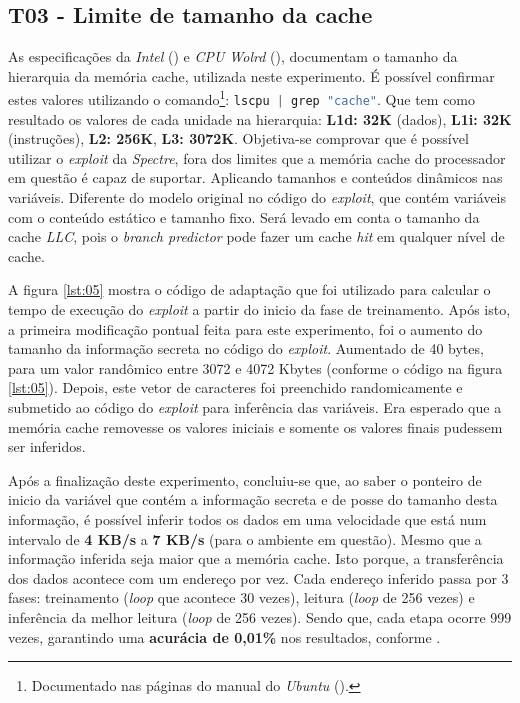 \documentclass[conference]{IEEEtran}
\begin{document}
\subsection{T03 - Limite de tamanho da cache}
As especificações da \emph{Intel} (\citeyear{Intel2019Corei3}) e \emph{CPU Wolrd} (\citeyear{CPU2016Corei3}), documentam o tamanho da hierarquia da memória cache, utilizada neste experimento. É possível confirmar estes valores utilizando o comando\footnote{Documentado nas páginas do manual do \emph{Ubuntu} (\citeyear{Ubuntu2019Lscpu}).}: \lstinline[language=C, style=c]{lscpu | grep "cache"}. Que tem como resultado os valores de cada unidade na hierarquia: \textbf{L1d: 32K} (dados), \textbf{L1i: 32K} (instruções), \textbf{L2: 256K}, \textbf{L3: 3072K}. Objetiva-se comprovar que é possível utilizar o \emph{exploit} da \emph{Spectre}, fora dos limites que a memória cache do processador em questão é capaz de suportar. Aplicando tamanhos e conteúdos dinâmicos nas variáveis. Diferente do modelo original no código do \emph{exploit}, que contém variáveis com o conteúdo estático e tamanho fixo. Será levado em conta o tamanho da cache \emph{LLC}, pois o \emph{branch predictor} pode fazer um cache \emph{hit} em qualquer nível de cache.

A figura \ref{lst:05} mostra o código de adaptação que foi utilizado para calcular o tempo de execução do \emph{exploit} a partir do inicio da fase de treinamento. Após isto, a primeira modificação pontual feita para este experimento, foi o aumento do tamanho da informação secreta no código do \emph{exploit}. Aumentado de 40 bytes, para um valor randômico entre 3072 e 4072 Kbytes (conforme o código na figura \ref{lst:05}). Depois, este vetor de caracteres foi preenchido randomicamente e submetido ao código do \emph{exploit} para inferência das variáveis. Era esperado que a memória cache removesse os valores iniciais e somente os valores finais pudessem ser inferidos.



Após a finalização deste experimento, concluiu-se que, ao saber o ponteiro de inicio da variável que contém a informação secreta e de posse do tamanho desta informação, é possível inferir todos os dados em uma velocidade que está num intervalo de \textbf{4 KB/s} a \textbf{7 KB/s} (para o ambiente em questão). Mesmo que a informação inferida seja maior que a memória cache. Isto porque, a transferência dos dados acontece com um endereço por vez. Cada endereço inferido passa por 3 fases: treinamento (\emph{loop} que acontece 30 vezes), leitura (\emph{loop} de 256 vezes) e inferência da melhor leitura (\emph{loop} de 256 vezes). Sendo que, cada etapa ocorre 999 vezes, garantindo uma \textbf{acurácia de 0,01\%} nos resultados, conforme .
\end{document}
